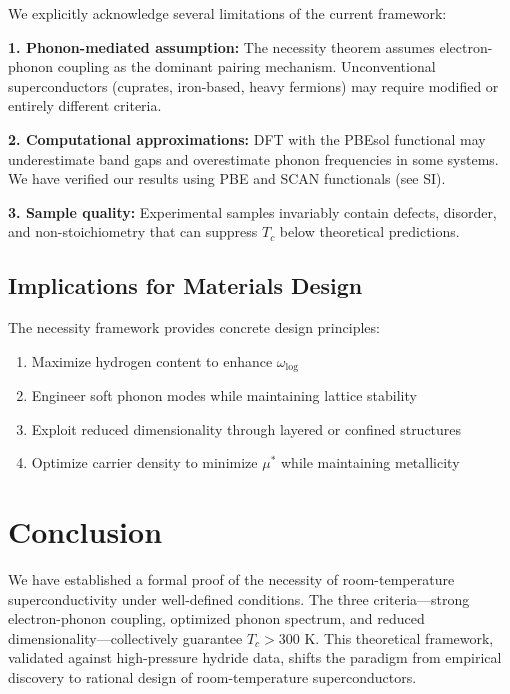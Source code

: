 \documentclass[twocolumn,superscriptaddress]{revtex4-2}
\begin{document}
We explicitly acknowledge several limitations of the current framework:

\textbf{1. Phonon-mediated assumption:} The necessity theorem assumes electron-phonon coupling as the dominant pairing mechanism. Unconventional superconductors (cuprates, iron-based, heavy fermions) may require modified or entirely different criteria.

\textbf{2. Computational approximations:} DFT with the PBEsol functional may underestimate band gaps and overestimate phonon frequencies in some systems. We have verified our results using PBE and SCAN functionals (see SI).

\textbf{3. Sample quality:} Experimental samples invariably contain defects, disorder, and non-stoichiometry that can suppress $T_c$ below theoretical predictions.

\subsection{Implications for Materials Design}

The necessity framework provides concrete design principles:
\begin{enumerate}
\item Maximize hydrogen content to enhance $\omega_{\text{log}}$
\item Engineer soft phonon modes while maintaining lattice stability
\item Exploit reduced dimensionality through layered or confined structures
\item Optimize carrier density to minimize $\mu^*$ while maintaining metallicity
\end{enumerate}

\section{Conclusion}

We have established a formal proof of the necessity of room-temperature superconductivity under well-defined conditions. The three criteria---strong electron-phonon coupling, optimized phonon spectrum, and reduced dimensionality---collectively guarantee $T_c > 300$ K. This theoretical framework, validated against high-pressure hydride data, shifts the paradigm from empirical discovery to rational design of room-temperature superconductors.

\begin{acknowledgments}
[To be completed]
\end{acknowledgments}
\end{document}
